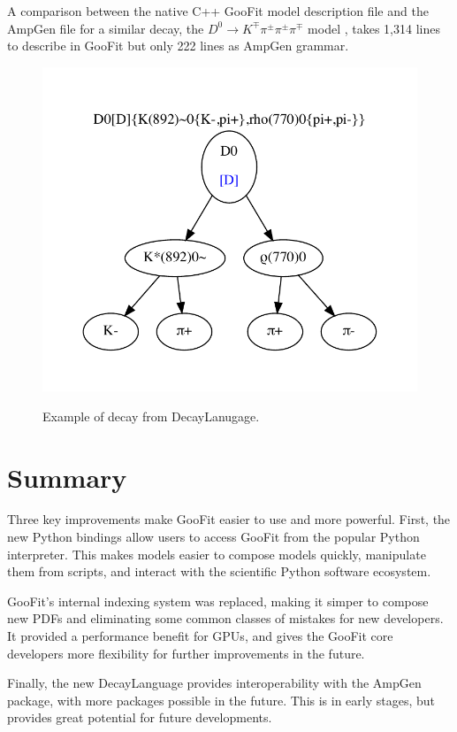 \documentclass{webofc}
\begin{document}
A comparison between the native C++ GooFit model description file and the AmpGen file for a similar decay, the  $D^0\rightarrow K^{\mp} \pi^{\pm} \pi^{\pm} \pi^{\mp}$ model , takes 1,314 lines to describe in GooFit but only 222 lines as AmpGen grammar.

\begin{figure}[h]
	\includegraphics[width=.5\textwidth]{LineExample}
	\label{figure-ampgen}
	\caption{Example of decay from DecayLanugage.}
\end{figure}

\section{Summary}
\label{sec-summary}

Three key improvements make GooFit easier to use and more powerful. First, the new Python bindings allow users to access GooFit from the popular Python interpreter. This makes models easier to compose models quickly, manipulate them from scripts, and interact with the scientific Python software ecosystem.

GooFit's internal indexing system was replaced, making it simper to compose new PDFs and eliminating some common classes of mistakes for new developers. It provided a performance benefit for GPUs, and gives the GooFit core developers more flexibility for further improvements in the future.

Finally, the new DecayLanguage provides interoperability with the AmpGen package, with more packages possible in the future. This is in early stages, but provides great potential for future developments.

\end{document}
